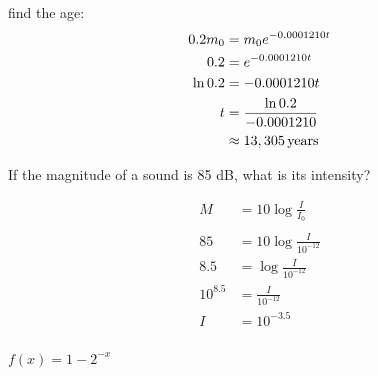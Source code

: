 \documentclass[fleqn,addpoints]{exam}
\begin{document}
\begin{questions}
\begin{solution}
        find the age:
        \begin{align*}
          0.2 m_0 & = m_0 e^{-0.0001210 t} \\
          0.2     & = e^{-0.0001210 t} \\
          \ln 0.2 & = -0.0001210 t \\
          t       & = \frac{\ln 0.2}{-0.0001210} \\
                  & \approx \unit[13,305]{years} \\
        \end{align*}
      \end{solution}

    \question[7]
      If the magnitude of a sound is 85 dB, what is its intensity?  
      

      \begin{solution}
        \begin{align*}
          M        & = 10 \log \frac{I}{I_0} \\
          \\
          85       & = 10 \log \frac{I}{10^{-12}} \\
          8.5      & = \log \frac{I}{10^{-12}} \\
          10^{8.5} & = \frac{I}{10^{-12}} \\
          I        & = 10^{-3.5} \\
        \end{align*}
      \end{solution}

    \question $f(x) = 1 - 2^{-x}$
\end{questions}
\end{document}
